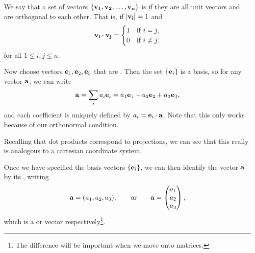 \documentclass[a4paper]{scrartcl}
\begin{document}
\begin{definition}[Orthonormal]
    We say that a set of vectors $\{\mathbf{v_1}, \mathbf{v_2}, \dots, \mathbf{v_n} \}$ is  if they are all unit vectors and are orthogonal to each other. That is, if $|\mathbf{v_i}| = 1$ and
    $$
        \mathbf{v_i} \cdot \mathbf{v_j} = \begin{cases}
            1 &\mbox{if } i = j, \\
            0 &\mbox{if } i \neq j.
           \end{cases}
    $$
    for all $1 \leq i, j \leq n$.
\end{definition}

Now choose vectors $\mathbf{e}_1, \mathbf{e}_2, \mathbf{e}_3$ that are . Then the set $\{\mathbf{e}_i \}$ is a basis, so for any vector $\mathbf{a}$, we can write
$$
\mathbf{a} = \sum_{i} a_i \mathbf{e}_i = a_1 \mathbf{e}_1 + a_2 \mathbf{e}_2 + a_3 \mathbf{e}_3,
$$
and each coefficient is uniquely defined by $a_i = \mathbf{e}_i \cdot \mathbf{a}$. Note that this only works because of our orthonormal condition.

Recalling that dot products correspond to projections, we can see that this really is analogous to a cartesian coordinate system.

\begin{center}
\end{center}
Once we have specified the basis vectors $\{\mathbf{e}_i\}$, we can then identify the vector $\mathbf{a}$ by its , writing 
$$
\mathbf{a} = (a_1, a_2, a_3), \quad \quad \text{or} \quad \quad \mathbf{a} = \begin{pmatrix} a_1 \\ a_2 \\ a_3 \end{pmatrix},
$$
which is a  or  vector respectively\footnote{The difference will be important when we move onto matrices.}.
\end{document}

